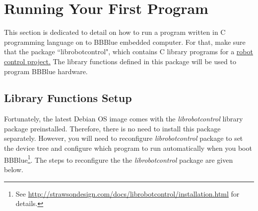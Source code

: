 \section{Running Your First Program}
\label{sec:firstprogram}

This section is dedicated to detail on how to run a program written in C
programming language on to BBBlue embedded computer. For that, make sure
that the package ``librobotcontrol", which contains C library programs for a
\ul{robot control project.} The library functions defined in this package will
be used to program BBBlue hardware.
\subsection{Library Functions Setup}
Fortunately, the latest Debian OS image comes with the \emph{librobotcontrol} library package preinstalled. Therefore, there is no need to install this package separately. However, you will need to reconfigure \emph{librobotcontrol} package to set the device tree and configure which program to run automatically when you boot BBBlue\footnote{See \url{http://strawsondesign.com/docs/librobotcontrol/installation.html} for details.}. The steps to reconfigure the the \emph{librobotcontrol} package are given below. 

